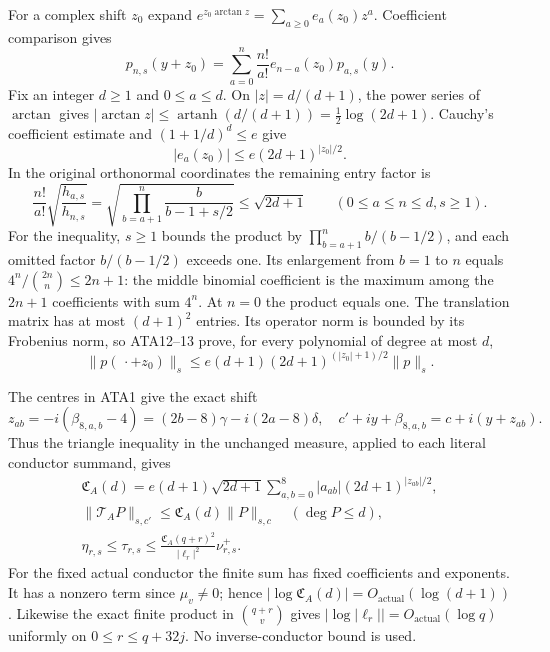 For a complex shift $z_0$ expand
$e^{z_0\arctan z}=\sum_{a\ge0}e_a(z_0)z^a$.
Coefficient comparison gives
\[
 p_{n,s}(y+z_0)=\sum_{a=0}^n\frac{n!}{a!}
                       e_{n-a}(z_0)p_{a,s}(y).         \tag{ATA11}
\]
Fix an integer $d\ge1$ and $0\le a\le d$.  On $|z|=d/(d+1)$,
the power series of $\arctan$ gives
$|\arctan z|\le\operatorname{artanh}(d/(d+1))
=\tfrac12\log(2d+1)$.  Cauchy's coefficient estimate and
$(1+1/d)^d\le e$ give
\[
 |e_a(z_0)|\le e(2d+1)^{|z_0|/2}.                      \tag{ATA12}
\]
In the original orthonormal coordinates the remaining entry factor is
\[
 \frac{n!}{a!}\sqrt{\frac{h_{a,s}}{h_{n,s}}}
  =\sqrt{\prod_{b=a+1}^n\frac{b}{b-1+s/2}}
  \le\sqrt{2d+1}\qquad(0\le a\le n\le d, s\ge1).     \tag{ATA13}
\]
For the inequality, $s\ge1$ bounds the product by
$\prod_{b=a+1}^nb/(b-1/2)$, and each omitted factor $b/(b-1/2)$
exceeds one.  Its enlargement from $b=1$ to $n$ equals
$4^n/\binom{2n}{n}\le2n+1$: the middle binomial coefficient
is the maximum among the $2n+1$ coefficients with sum $4^n$.
At $n=0$ the product equals one.
The translation matrix has at most $(d+1)^2$ entries.  Its operator
norm is bounded by its Frobenius norm, so ATA12--13 prove, for every
polynomial of degree at most $d$,
\[
 \|p(\,\cdot+z_0)\|_s
 \le e(d+1)(2d+1)^{(|z_0|+1)/2}\|p\|_s.                \tag{ATA14}
\]

The centres in ATA1 give the exact shift
\[
 z_{ab}=-i(\beta_{8,a,b}-4)
       =(2b-8)\gamma-i(2a-8)\delta,
 \quad c'+iy+\beta_{8,a,b}=c+i(y+z_{ab}).
\]
Thus the triangle inequality in the unchanged measure, applied to
each literal conductor summand, gives
\[
\begin{gathered}
 \mathfrak C_A(d)=e(d+1)\sqrt{2d+1}
                \sum_{a,b=0}^8|a_{ab}|(2d+1)^{|z_{ab}|/2},\\
 \|\mathcal T_AP\|_{s,c'}\le\mathfrak C_A(d)\|P\|_{s,c}
       \quad(\deg P\le d),\\
 \eta_{r,s}\le\tau_{r,s}
       \le\frac{\mathfrak C_A(q+r)^2}{|\ell_r|^2}\nu^+_{r,s}.
\end{gathered}\tag{ATA15}
\]
For the fixed actual conductor the finite sum has fixed coefficients
and exponents.  It has a nonzero term since $\mu_v\ne0$; hence
$|\log\mathfrak C_A(d)|=O_{\mathrm{actual}}(\log(d+1))$.
Likewise the exact finite product in $\binom{q+r}{v}$ gives
$|\log|\ell_r||=O_{\mathrm{actual}}(\log q)$ uniformly on
$0\le r\le q+32j$.  No inverse-conductor bound is used.

